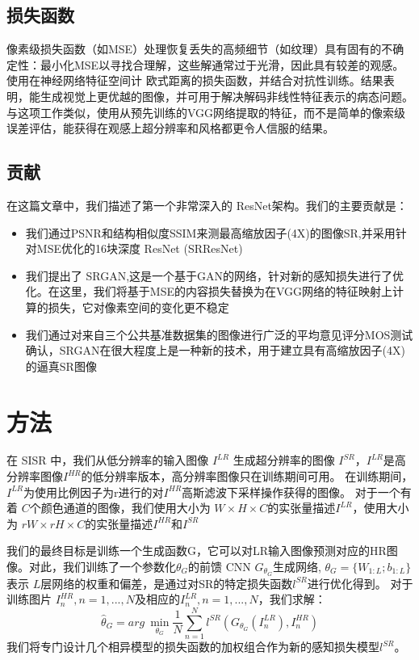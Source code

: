 \documentclass[UTF8,a4paper,10pt]{ctexrep}
\begin{document}
\subsection{损失函数}
像素级损失函数（如MSE）处理恢复丢失的高频细节（如纹理）具有固有的不确定性：最小化MSE以寻找合理解，这些解通常过于光滑，因此具有较差的观感。
使用在神经网络特征空间计 欧式距离的损失函数，并结合对抗性训练。结果表明，能生成视觉上更优越的图像，并可用于解决解码非线性特征表示的病态问题。与这项工作类似，使用从预先训练的VGG网络提取的特征，而不是简单的像索级误差评估，能获得在观感上超分辨率和风格都更令人信服的结果。

\subsection{贡献}
在这篇文章中，我们描述了第一个非常深入的 ResNet架构。我们的主要贡献是：
\begin{itemize}
  \item 我们通过PSNR和结构相似度SSIM来测最高缩放因子(4X)的图像SR,并采用针对MSE优化的16块深度 ResNet (SRResNet)
  \item 我们提出了 SRGAN,这是一个基于GAN的网络，针对新的感知损失进行了优化。在这里，我们将基于MSE的内容损失替换为在VGG网络的特征映射上计算的损失，它对像素空间的变化更不稳定
  \item 我们通过对来自三个公共基准数据集的图像进行广泛的平均意见评分MOS测试确认，SRGAN在很大程度上是一种新的技术，用于建立具有高缩放因子(4X)的逼真SR图像
\end{itemize}

\section{方法}
在 SISR 中，我们从低分辨率的输入图像 $I^{LR}$ 生成超分辨率的图像 $I^{SR}$，$I^{LR}$是高分辨率图像$I^{HR}$的低分辨率版本，高分辨率图像只在训练期间可用。
在训练期间，$I^{LR}$为使用比例因子为r进行的对$I^{HR}$高斯滤波下采样操作获得的图像。
对于一个有着 $C$个颜色通道的图像，我们使用大小为 $W × H × C$的实张量描述$I^{LR}$，使用大小为 $rW × rH × C$的实张量描述$I^{HR}$和$I^{SR}$

我们的最终目标是训练一个生成函数G，它可以对LR输入图像预测对应的HR图像。对此，我们训练了一个参数化$\theta_G$的前馈 CNN $G_{\theta_G}$生成网络,
$\theta_G = \{W_{1:L};b_{1:L}\}$表示 $L$层网络的权重和偏差，是通过对SR的特定损失函数$l^{SR}$进行优化得到。
对于训练图片 $I^{HR}_n, n = 1, ..., N$及相应的$I^{LR}_n, n = 1, ..., N$，我们求解：
\begin{equation}
  \hat{\theta}_G = arg\ \mathop{min}\limits_{\theta_G} \frac{1}{N} \sum_{n = 1}^{N} l^{SR}(G_{\theta_G}(I_n^{LR}), I_n^{HR})\label{eq:1}
\end{equation}
我们将专门设计几个相异模型的损失函数的加权组合作为新的感知损失模型$l^{SR}$。
\end{document}
